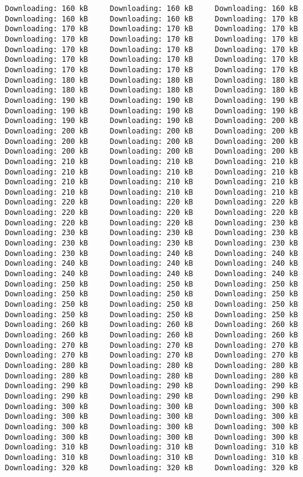 \documentclass[
  12pt,
]{report}
\begin{document}
\begin{verbatim}
Downloading: 160 kB     Downloading: 160 kB     Downloading: 160 kB     Downloading: 160 kB     Downloading: 160 kB     Downloading: 170 kB     Downloading: 170 kB     Downloading: 170 kB     Downloading: 170 kB     Downloading: 170 kB     Downloading: 170 kB     Downloading: 170 kB     Downloading: 170 kB     Downloading: 170 kB     Downloading: 170 kB     Downloading: 170 kB     Downloading: 170 kB     Downloading: 170 kB     Downloading: 170 kB     Downloading: 170 kB     Downloading: 170 kB     Downloading: 180 kB     Downloading: 180 kB     Downloading: 180 kB     Downloading: 180 kB     Downloading: 180 kB     Downloading: 180 kB     Downloading: 190 kB     Downloading: 190 kB     Downloading: 190 kB     Downloading: 190 kB     Downloading: 190 kB     Downloading: 190 kB     Downloading: 190 kB     Downloading: 190 kB     Downloading: 200 kB     Downloading: 200 kB     Downloading: 200 kB     Downloading: 200 kB     Downloading: 200 kB     Downloading: 200 kB     Downloading: 200 kB     Downloading: 200 kB     Downloading: 200 kB     Downloading: 200 kB     Downloading: 210 kB     Downloading: 210 kB     Downloading: 210 kB     Downloading: 210 kB     Downloading: 210 kB     Downloading: 210 kB     Downloading: 210 kB     Downloading: 210 kB     Downloading: 210 kB     Downloading: 210 kB     Downloading: 210 kB     Downloading: 210 kB     Downloading: 220 kB     Downloading: 220 kB     Downloading: 220 kB     Downloading: 220 kB     Downloading: 220 kB     Downloading: 220 kB     Downloading: 220 kB     Downloading: 220 kB     Downloading: 230 kB     Downloading: 230 kB     Downloading: 230 kB     Downloading: 230 kB     Downloading: 230 kB     Downloading: 230 kB     Downloading: 230 kB     Downloading: 230 kB     Downloading: 240 kB     Downloading: 240 kB     Downloading: 240 kB     Downloading: 240 kB     Downloading: 240 kB     Downloading: 240 kB     Downloading: 240 kB     Downloading: 240 kB     Downloading: 250 kB     Downloading: 250 kB     Downloading: 250 kB     Downloading: 250 kB     Downloading: 250 kB     Downloading: 250 kB     Downloading: 250 kB     Downloading: 250 kB     Downloading: 250 kB     Downloading: 250 kB     Downloading: 250 kB     Downloading: 250 kB     Downloading: 260 kB     Downloading: 260 kB     Downloading: 260 kB     Downloading: 260 kB     Downloading: 260 kB     Downloading: 260 kB     Downloading: 270 kB     Downloading: 270 kB     Downloading: 270 kB     Downloading: 270 kB     Downloading: 270 kB     Downloading: 270 kB     Downloading: 280 kB     Downloading: 280 kB     Downloading: 280 kB     Downloading: 280 kB     Downloading: 280 kB     Downloading: 280 kB     Downloading: 290 kB     Downloading: 290 kB     Downloading: 290 kB     Downloading: 290 kB     Downloading: 290 kB     Downloading: 290 kB     Downloading: 300 kB     Downloading: 300 kB     Downloading: 300 kB     Downloading: 300 kB     Downloading: 300 kB     Downloading: 300 kB     Downloading: 300 kB     Downloading: 300 kB     Downloading: 300 kB     Downloading: 300 kB     Downloading: 300 kB     Downloading: 300 kB     Downloading: 310 kB     Downloading: 310 kB     Downloading: 310 kB     Downloading: 310 kB     Downloading: 310 kB     Downloading: 310 kB     Downloading: 320 kB     Downloading: 320 kB     Downloading: 320 kB     
\end{verbatim}
\end{document}
